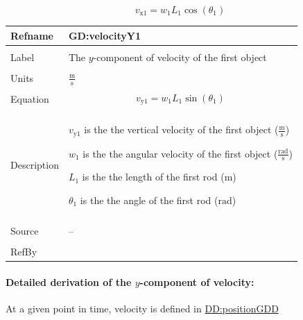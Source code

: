\documentclass[12pt]{article}
\begin{document}
\begin{displaymath}
{v_{\text{x}1}}={w_{1}} {L_{1}} \cos\left({θ_{1}}\right)
\end{displaymath}
\vspace{\baselineskip}
\noindent
\begin{minipage}{\textwidth}
\begin{tabular}{>{\raggedright}p{}>{\raggedright\arraybackslash}p{}}
\toprule \textbf{Refname} & \textbf{GD:velocityY1}
\label{GD:velocityY1}
\\ \midrule \\
Label & The $y$-component of velocity of the first object
        
\\ \midrule \\
Units & $\frac{\text{m}}{\text{s}}$
        
\\ \midrule \\
Equation & \begin{displaymath}
           {v_{\text{y}1}}={w_{1}} {L_{1}} \sin\left({θ_{1}}\right)
           \end{displaymath}
\\ \midrule \\
Description & \begin{symbDescription}
              \item{${v_{\text{y}1}}$ is the the vertical velocity of the first object ($\frac{\text{m}}{\text{s}}$)}
              \item{${w_{1}}$ is the the angular velocity of the first object ($\frac{\text{rad}}{\text{s}}$)}
              \item{${L_{1}}$ is the the length of the first rod (${\text{m}}$)}
              \item{${θ_{1}}$ is the the angle of the first rod (${\text{rad}}$)}
              \end{symbDescription}
\\ \midrule \\
Source & --
         
\\ \midrule \\
RefBy & 
\\ \bottomrule
\end{tabular}
\end{minipage}
\paragraph{Detailed derivation of the $y$-component of velocity:}
\label{GD:velocityY1Deriv}
At a given point in time, velocity is defined in \hyperref[DD:positionGDD]{DD:positionGDD}
\end{document}
